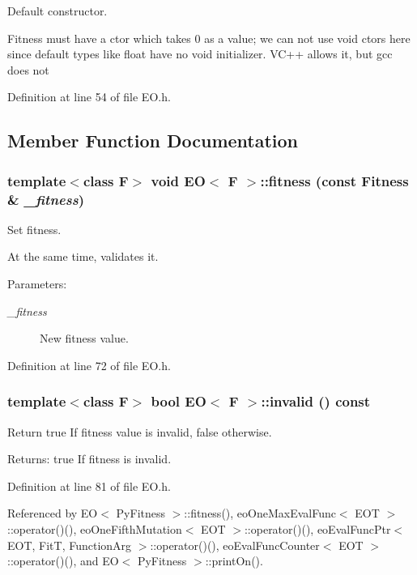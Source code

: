Default constructor. 

Fitness must have a ctor which takes 0 as a value; we can not use void ctors here since default types like float have no void initializer. VC++ allows it, but gcc does not 

Definition at line 54 of file EO.h.

\subsection{Member Function Documentation}
\subsubsection{\setlength{\rightskip}{0pt plus 5cm}template$<$class F$>$ void {\bf EO}$<$ F $>$::fitness (const Fitness \& {\em \_\-fitness})\hspace{0.3cm}{\tt  [inline]}}\label{class_e_o_a4}


Set fitness. 

At the same time, validates it. \begin{Desc}
\item[Parameters:]
\begin{description}
\item[{\em \_\-fitness}]New fitness value. \end{description}
\end{Desc}


Definition at line 72 of file EO.h.
\subsubsection{\setlength{\rightskip}{0pt plus 5cm}template$<$class F$>$ bool {\bf EO}$<$ F $>$::invalid () const\hspace{0.3cm}{\tt  [inline]}}\label{class_e_o_a5}


Return true If fitness value is invalid, false otherwise. 

\begin{Desc}
\item[Returns:]true If fitness is invalid. \end{Desc}


Definition at line 81 of file EO.h.

Referenced by EO$<$ Py\-Fitness $>$::fitness(), eo\-One\-Max\-Eval\-Func$<$ EOT $>$::operator()(), eo\-One\-Fifth\-Mutation$<$ EOT $>$::operator()(), eo\-Eval\-Func\-Ptr$<$ EOT, Fit\-T, Function\-Arg $>$::operator()(), eo\-Eval\-Func\-Counter$<$ EOT $>$::operator()(), and EO$<$ Py\-Fitness $>$::print\-On().
